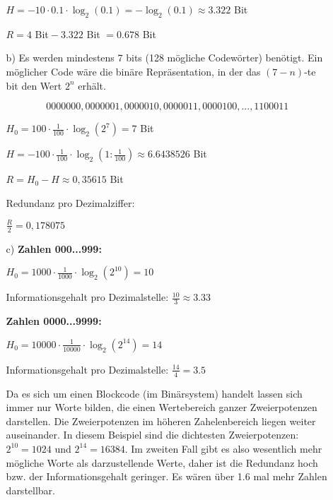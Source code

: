 \documentclass[a4paper,10pt]{scrartcl}
\begin{document}
\begin{enumerate}
\begin{enumerate}
                $H = - 10 \cdot 0.1 \cdot \log_2(0.1) = -\log_2(0.1) \approx 3.322$ Bit

                $R = 4$ Bit${}- 3.322$ Bit $= 0.678$ Bit

            \item[b)]
                Es werden mindestens 7 bits (128 mögliche Codewörter) benötigt. Ein möglicher
                Code wäre die binäre Repräsentation, in der das $(7-n)$-te bit den Wert $2^n$
                erhält.

                $$0000000, 0000001, 0000010, 0000011, 0000100, ..., 1100011$$

                $H_0 = 100 \cdot \frac{1}{100} \cdot \log_2(2^7) = 7 $ Bit

                $H = - 100 \cdot \frac{1}{100} \cdot \log_2(1: \frac{1}{100}) \approx 6.6438526$ Bit

                $R = H_0 - H \approx 0,35615$ Bit

                Redundanz pro Dezimalziffer:

                $\frac{R}{2}=0,178075$


            \item[c)]
                \textbf{Zahlen 000...999:}

                    $H_0 = 1000 \cdot \frac{1}{1000} \cdot \log_2(2^{10}) = 10$

                    Informationsgehalt pro Dezimalstelle: $\frac{10}{3} \approx 3.33$

                \textbf{Zahlen 0000...9999:}

                    $H_0 = 10000 \cdot \frac{1}{10000} \cdot \log_2(2^{14}) = 14$

                    Informationsgehalt pro Dezimalstelle: $\frac{14}{4} = 3.5$

                    Da es sich um einen Blockcode (im Binärsystem) handelt lassen sich immer nur Worte bilden, die einen
                    Wertebereich ganzer Zweierpotenzen darstellen.
                    Die Zweierpotenzen im höheren Zahelenbereich liegen weiter auseinander.
                    In diesem Beispiel sind die dichtesten Zweierpotenzen: $2^{10} = 1024$ und $2^{14} = 16384$.
                    Im zweiten Fall gibt es also wesentlich mehr mögliche Worte als darzustellende Werte, daher ist die
                    Redundanz hoch bzw. der Informationsgehalt geringer. Es wären über 1.6 mal mehr Zahlen darstellbar.


\end{enumerate}
\end{enumerate}
\end{document}
